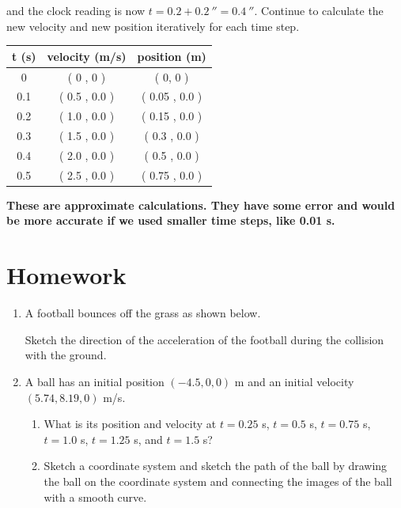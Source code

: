 {and the clock reading is now $t=0.2+0.2\ \second=0.4\ \second$. Continue to calculate the new velocity and new position iteratively for each time step.

\begin{center}
\begin{tabular}{|c|c|c|}
\hline
 t (s) & velocity (m/s) & position (m) \\
\hline
\hline 
  0  & ( 0 , 0 ) & ( 0, 0 )  \\
\hline 
  0.1  & ( 0.5 , 0.0 )  & ( 0.05 , 0.0 )  \\
\hline 
  0.2  & ( 1.0 , 0.0 )  & ( 0.15 , 0.0 )  \\
\hline 
  0.3  & ( 1.5 , 0.0 )  & ( 0.3 , 0.0 )  \\
\hline 
  0.4  & ( 2.0 , 0.0 )  & ( 0.5 , 0.0 )  \\
\hline 
  0.5  & ( 2.5 , 0.0 )  & ( 0.75 , 0.0 )  \\
\hline 
\hline
\end{tabular}
\end{center}

{\bf These are approximate calculations. They have some error and would be more accurate if we used smaller time steps, like 0.01 s.}

}

\pagebreak

\section*{Homework}

\begin{enumerate}
	\item A football bounces off the grass as shown below. 
	

Sketch the direction of the acceleration of the football during the collision with the ground.

	\item A ball has an initial position $(-4.5, 0, 0)$ m and an initial velocity $(5.74, 8.19, 0)$ m/s.
	\begin{enumerate}
		\item  What is its position and velocity at $t=0.25$ s, $t=0.5$ s, $t=0.75$ s, $t=1.0$ s, $t=1.25$ s, and $t=1.5$ s?
		\item Sketch a coordinate system and sketch the path of the ball by drawing the ball on the coordinate system and connecting the images of the ball with a smooth curve.
	\end{enumerate}

	
\end{enumerate}

